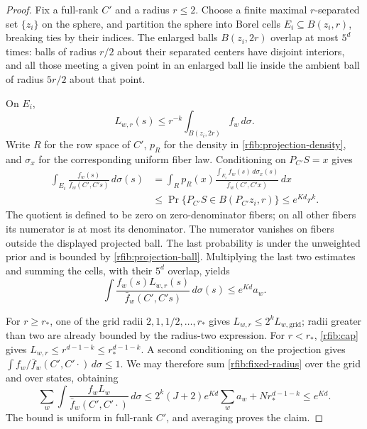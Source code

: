 \begin{proof}
Fix a full-rank \(C'\) and a radius \(r\le2\).  Choose a finite
maximal \(r\)-separated set \(\{z_i\}\) on the sphere, and partition
the sphere into Borel cells \(E_i\subseteq B(z_i,r)\), breaking ties
by their indices.  The enlarged balls \(B(z_i,2r)\) overlap at most
\(5^d\) times: balls of radius \(r/2\) about their separated centers
have disjoint interiors, and all those meeting a given point in an
enlarged ball lie inside the ambient ball of radius \(5r/2\) about
that point.

On \(E_i\),
\[
 L_{w,r}(s)\le r^{-k}\int_{B(z_i,2r)}f_w\,d\sigma.
\]
Write \(R\) for the row space of \(C'\), \(p_R\) for the density in
\eqref{rfib:projection-density}, and \(\sigma_x\) for the corresponding
uniform fiber law.  Conditioning on \(P_{C'}S=x\) gives
\begin{align*}
 \int_{E_i}\frac{f_w(s)}{\bar f_w(C',C's)}\,d\sigma(s)
 &=\int_R p_R(x)
   \frac{\int_{E_i}f_w(s)\,d\sigma_x(s)}
        {\bar f_w(C',C'x)}\,dx\\
 &\le\Pr\{P_{C'}S\in B(P_{C'}z_i,r)\}
 \le e^{Kd}r^k .
\end{align*}
The quotient is defined to be zero on zero-denominator fibers; on all
other fibers its numerator is at most its denominator.  The numerator
vanishes on fibers outside the displayed projected ball.  The last
probability is under the unweighted prior and is bounded by
\eqref{rfib:projection-ball}.  Multiplying the last two estimates and
summing the cells, with their \(5^d\) overlap, yields
\begin{equation}\label{rfib:fixed-radius}
 \int\frac{f_w(s)L_{w,r}(s)}
           {\bar f_w(C',C's)}\,d\sigma(s)
 \le e^{Kd}a_w .
\end{equation}

For \(r\ge r_*\), one of the grid radii
\(2,1,1/2,\ldots,r_*\) gives
\(L_{w,r}\le2^k L_{w,\mathrm{grid}}\); radii greater than two are
already bounded by the radius-two expression.  For \(r<r_*\),
\eqref{rfib:cap} gives
\(L_{w,r}\le r^{d-1-k}\le r_*^{d-1-k}\).
A second conditioning on the projection gives
\(\int f_w/\bar f_w(C',C'\cdot)\,d\sigma\le1\).
We may therefore sum \eqref{rfib:fixed-radius} over the grid and over
states, obtaining
\[
 \sum_w\int\frac{f_wL_w}{\bar f_w(C',C'\cdot)}\,d\sigma
 \le 2^k(J+2)e^{Kd}\sum_w a_w+Nr_*^{d-1-k}
 \le e^{Kd}.
\]
The bound is uniform in full-rank \(C'\), and averaging proves the
claim.
\end{proof}

